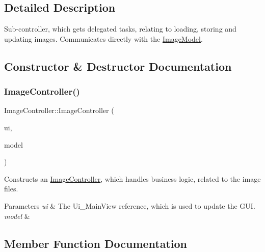 \subsection{Detailed Description}
Sub-\/controller, which gets delegated tasks, relating to loading, storing and updating images. Communicates directly with the \hyperlink{classImageModel}{Image\+Model}. 

\subsection{Constructor \& Destructor Documentation}
\mbox{\label{classImageController_a317e49c29f50578a1001b73749151e3a}} 
\subsubsection{\texorpdfstring{Image\+Controller()}{ImageController()}}
{\footnotesize\ttfamily Image\+Controller\+::\+Image\+Controller (\begin{DoxyParamCaption}\item[{Ui\+\_\+\+Main\+View \&}]{ui,  }\item[{\hyperlink{classImageModel}{Image\+Model} \&}]{model }\end{DoxyParamCaption})}



Constructs an \hyperlink{classImageController}{Image\+Controller}, which handles business logic, related to the image files. 


\begin{DoxyParams}{Parameters}
{\em ui} & The Ui\+\_\+\+Main\+View reference, which is used to update the G\+UI. \\
\hline
{\em model} & \\
\hline
\end{DoxyParams}


\subsection{Member Function Documentation}
\mbox{\label{classImageController_adaade0712de089f06a9a267399004cab}} 
